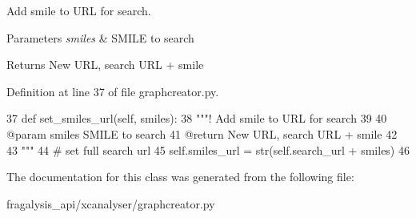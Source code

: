 Add smile to U\+RL for search. 


\begin{DoxyParams}{Parameters}
{\em smiles} & S\+M\+I\+LE to search \\
\hline
\end{DoxyParams}
\begin{DoxyReturn}{Returns}
New U\+RL, search U\+RL + smile 
\end{DoxyReturn}


Definition at line 37 of file graphcreator.\+py.


\begin{DoxyCode}
37     \textcolor{keyword}{def }set\_smiles\_url(self, smiles):
38         \textcolor{stringliteral}{"""! Add smile to URL for search}
39 \textcolor{stringliteral}{}
40 \textcolor{stringliteral}{        @param smiles SMILE to search}
41 \textcolor{stringliteral}{        @return New URL, search URL + smile}
42 \textcolor{stringliteral}{}
43 \textcolor{stringliteral}{        """}
44         \textcolor{comment}{# set full search url}
45         self.smiles\_url = str(self.search\_url + smiles)
46 
\end{DoxyCode}


The documentation for this class was generated from the following file\+:\begin{DoxyCompactItemize}
\item 
fragalysis\+\_\+api/xcanalyser/graphcreator.\+py\end{DoxyCompactItemize}
